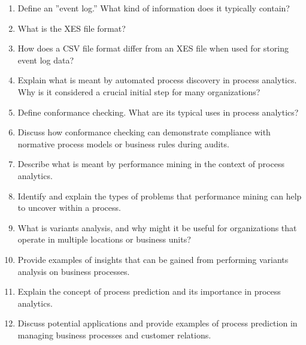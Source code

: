 \begin{enumerate}[nosep]
    \item Define an ''event log.'' What kind of information does it typically contain?
    \item What is the XES file format?
    \item How does a CSV file format differ from an XES file when used for storing event log data?
    \item Explain what is meant by automated process discovery in process analytics. Why is it considered a crucial initial step for many organizations?
    \item Define conformance checking. What are its typical uses in process analytics?
    \item Discuss how conformance checking can demonstrate compliance with normative process models or business rules during audits.
    \item Describe what is meant by performance mining in the context of process analytics.
    \item Identify and explain the types of problems that performance mining can help to uncover within a process.
    \item What is variants analysis, and why might it be useful for organizations that operate in multiple locations or business units?
    \item Provide examples of insights that can be gained from performing variants analysis on business processes.
    \item Explain the concept of process prediction and its importance in process analytics.
    \item Discuss potential applications and provide examples of process prediction in managing business processes and customer relations.
\end{enumerate}

